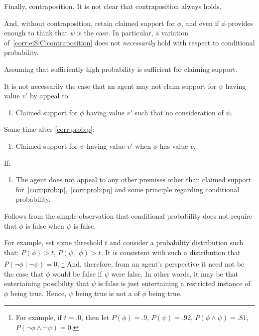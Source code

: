 \begin{note}
  Finally, contraposition.
  It is not clear that contraposition always holds.

  And, without contraposition, retain claimed support for \(\phi\), and even if \mom{} \(\phi\) provides enough to think that \(\psi\) is the case.
  In particular, a variation of~\ref{corr:eiS:C:contraposition} does not \emph{necessarily} hold with respect to conditional probability.

  \begin{idea}\label{conj:eiS:C:probability}
    Assuming that sufficiently high probability is sufficient for claiming support.

    It is not necessarily the case that an agent may not claim support for \(\psi\) having value \(v'\) by appeal to:
    \begin{enumerate}[label=\arabic*., ref=(\arabic*)]
    \item\label{corr:prob:p} Claimed support for \(\phi\) having value \(v'\) such that no consideration of \(\psi\).
    \end{enumerate}

    Some time after \ref{corr:prob:p}:

    \begin{enumerate}[label=\arabic*., ref=(\arabic*), resume]
  \item\label{corr:prob:pq} Claimed support for \(\psi\) having value \(v'\) when \(\phi\) has value \(v\).
    \end{enumerate}

    If:
    \begin{enumerate}[label=\arabic*., ref=(\arabic*), resume]
    \item The agent does not appeal to any other premises other than claimed support for~\ref{corr:prob:p},~\ref{corr:prob:pq} and some principle regarding conditional probability.
    \end{enumerate}
    \vspace{-\baselineskip}
  \end{idea}

  Follows from the simple observation that conditional probability does not require that \(\phi\) is false when \(\psi\) is false.

  For example, set some threshold \(t\) and consider a probability distribution such that:
  \(P(\phi) > t\), \(P(\psi \mid \phi) > t\).
  It is consistent with such a distribution that \(P(\lnot\phi \mid \lnot\psi) = 0\).\nolinebreak
  \footnote{
    For example, if \(t = .0\), then let \(P(\phi) = .9\), \(P(\psi) = .92\), \(P(\phi \land \psi) = .81\), \(P(\lnot\phi \land \lnot\psi) = 0\).
  }
  And, therefore, from an agent's perspective it need not be the case that \(\phi\) would be false if \(\psi\) were false.
  In other words, it may be that entertaining possibility that \(\psi\) is false is just entertaining a restricted instance of \(\phi\) being true.
  Hence, \(\psi\) being true is not a \requ{} of \(\phi\) being true.


\end{note}
